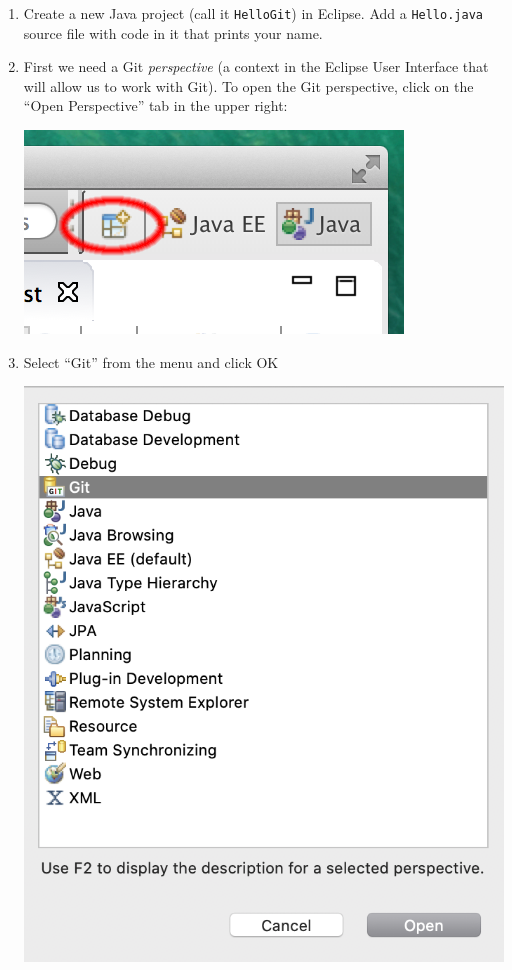 \documentclass[12pt]{scrartcl}
\begin{document}
\begin{enumerate}
  \item Create a new Java project (call it \texttt{HelloGit}) 
  in Eclipse.  Add a \texttt{Hello.java} source file with 
  code in it that prints your name.
  
  \item First we need a Git \emph{perspective} (a context in the Eclipse 
  User Interface that will allow us to work with Git). To open the Git 
  perspective, click on the ``Open Perspective'' tab in the upper right:
  	\begin{center}
	\includegraphics[scale=0.75]{./hack1.0-files/eclipseOpenPerspectiveMarkUp}
	\end{center}
  \item Select ``Git'' from the menu and click OK
  	\begin{center}
	\includegraphics[scale=0.5]{./hack1.0-files/eclipsePerspectiveDialog.png}

\end{center}
\end{enumerate}
\end{document}
